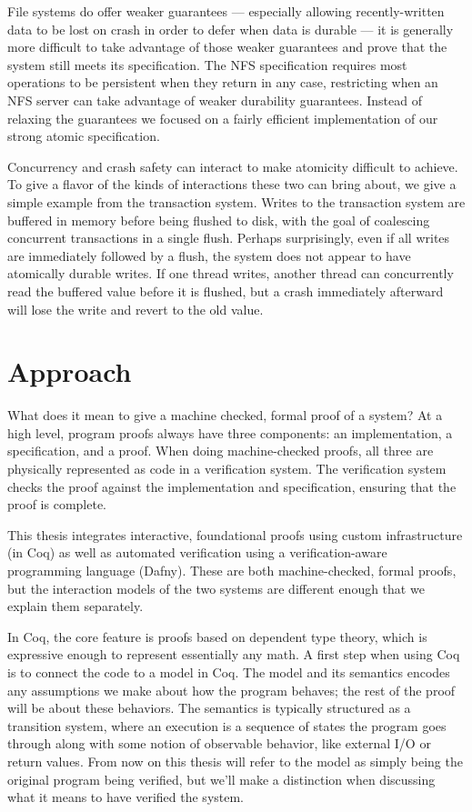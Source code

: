 File systems do offer weaker guarantees --- especially allowing recently-written
data to be lost on crash in order to defer when data is
durable --- it is generally more difficult to take
advantage of those weaker guarantees and prove that the system still meets its
specification. The NFS specification requires most operations to be persistent
when they return in any case, restricting when an NFS server can take advantage
of weaker durability guarantees. Instead of relaxing the guarantees we focused
on a fairly efficient implementation of our strong atomic specification.

Concurrency and crash safety can interact to make atomicity difficult to
achieve. To give a flavor of the kinds of interactions these two can bring
about, we give a simple example from the transaction system. Writes to the
transaction system are buffered in memory before being flushed to disk, with the
goal of coalescing concurrent transactions in a single flush. Perhaps
surprisingly, even if all writes are immediately followed by a flush, the system
does not appear to have atomically durable writes. If one thread writes, another
thread can concurrently read the buffered value before it is flushed, but a
crash immediately afterward will lose the write and revert to the old value.

\section{Approach}

What does it mean to give a machine checked, formal proof of a system? At a high
level, program proofs always have three components: an implementation, a
specification, and a proof. When doing machine-checked proofs, all three are
physically represented as code in a verification system. The verification system
checks the proof against the implementation and specification, ensuring that the
proof is complete.


This thesis integrates interactive, foundational proofs using custom
infrastructure (in Coq) as well as automated verification using a
verification-aware programming language (Dafny). These are both machine-checked,
formal proofs, but the interaction models of the two systems are different
enough that we explain them separately.

In Coq, the core feature is proofs based on dependent type theory, which is
expressive enough to represent essentially any math. A first step when using Coq
is to connect the code to a model in Coq. The model and its semantics encodes any
assumptions we make about how the program behaves; the rest of the proof will be
about these behaviors. The semantics is typically structured as a transition
system, where an execution is a sequence of states the program goes through
along with some notion of observable behavior, like external I/O or return
values. From now on this thesis will refer to the model as simply being the original
program being verified,
but we'll make a distinction when discussing what it means to have verified
the system.


